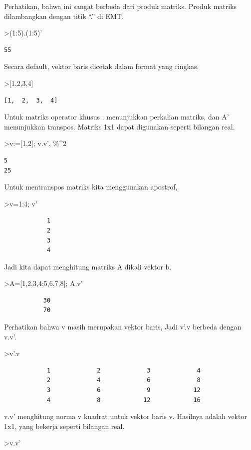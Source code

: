 \documentclass[
]{book}
\begin{document}
Perhatikan, bahwa ini sangat berbeda dari produk matriks. Produk matriks dilambangkan dengan titik ``.'' di EMT.

\textgreater(1:5).(1:5)'

\begin{verbatim}
55
\end{verbatim}

Secara default, vektor baris dicetak dalam format yang ringkas.

\textgreater{[}1,2,3,4{]}

\begin{verbatim}
[1,  2,  3,  4]
\end{verbatim}

Untuk matriks operator khusus . menunjukkan perkalian matriks, dan A' menunjukkan transpos. Matriks 1x1 dapat digunakan seperti bilangan real.

\textgreater v:={[}1,2{]}; v.v', \%\^{}2

\begin{verbatim}
5
25
\end{verbatim}

Untuk mentranspos matriks kita menggunakan apostrof,

\textgreater v=1:4; v'

\begin{verbatim}
            1 
            2 
            3 
            4 
\end{verbatim}

Jadi kita dapat menghitung matriks A dikali vektor b.

\textgreater A={[}1,2,3,4;5,6,7,8{]}; A.v'

\begin{verbatim}
           30 
           70 
\end{verbatim}

Perhatikan bahwa v masih merupakan vektor baris, Jadi v'.v berbeda dengan v.v'.

\textgreater v'.v

\begin{verbatim}
            1             2             3             4 
            2             4             6             8 
            3             6             9            12 
            4             8            12            16 
\end{verbatim}

v.v' menghitung norma v kuadrat untuk vektor baris v. Hasilnya adalah vektor 1x1, yang bekerja seperti bilangan real.

\textgreater v.v'
\end{document}
